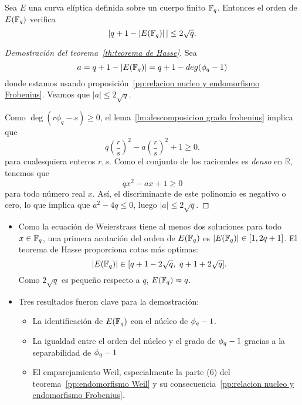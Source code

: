 \begin{teorema2}[\ref{th:teorema de Hasse}]
	Sea $E$ una curva elíptica definida sobre un cuerpo finito $\mathbb{F}_q$. Entonces el orden de $E(\mathbb{F}_q)$ verifica
	$$
		|q + 1 - \left\vert{E(\mathbb{F}_{q})}\right\vert| \le 2 \sqrt{q}.
	$$
\end{teorema2}
\begin{proof}[Demostración del teorema~\ref{th:teorema de Hasse}]
Sea
$$
	a = q + 1 - \left\vert{E(\mathbb{F}_{q})}\right\vert = q + 1 - deg(\phi_q - 1)
$$
donde estamos usando proposición~\ref{pp:relacion nucleo y endomorfismo Frobenius}. Veamos que $|a| \le 2 \sqrt{q}$.

Como $\deg(r \phi_q - s) \ge 0$, el lema~\ref{lm:descomposicion grado frobenius} implica que
$$
q \left( \frac{r}{s} \right)^2 - a \left(\frac{r}{s} \right) ^2 + 1 \ge 0.
$$
para cualesquiera enteros $r, s$. Como el conjunto de los racionales es \emph{denso} en $\mathbb{R}$, tenemos que
$$
q x^2 - a x + 1 \ge 0
$$
para todo número real $x$. Así, el discriminante de este polinomio es negativo o cero, lo que implica que $a^2 - 4 q \le 0$, luego $| a | \le 2 \sqrt{q}$.
\end{proof}

\begin{nota}\leavevmode
	\begin{itemize}
		\item Como la ecuación de Weierstrass tiene al menos dos soluciones para todo $x \in \mathbb{F}_q$, una primera acotación del orden de $E(\mathbb{F}_q)$ es  $\left\vert{E(\mathbb{F}_{q})}\right\vert \in [1, 2 q + 1]$. El teorema de Hasse proporciona cotas más optimas:
		$$
		\left\vert{E(\mathbb{F}_{q})}\right\vert \in [q + 1 - 2 \sqrt{q}, \ q + 1 + 2 \sqrt{q}].
		$$
		Como $2\sqrt{q}$ es pequeño respecto a $q$, $E(\mathbb{F}_q) \approx q$.
		\item Tres resultados fueron clave para la demostración:
			\begin{itemize}
				\item La identificación de $E(\mathbb{F}_q)$ con el núcleo de $\phi_q - 1$.
				\item La igualdad entre el orden del núcleo y el grado de $\phi_q - 1$ gracias a la separabilidad de $\phi_q - 1$
				\item El emparejamiento Weil, especialmente la parte (6) del teorema~\ref{pp:endomorfismo Weil} y su consecuencia~\ref{pp:relacion nucleo y endomorfismo Frobenius}.
			\end{itemize}
	\end{itemize}
\end{nota}

